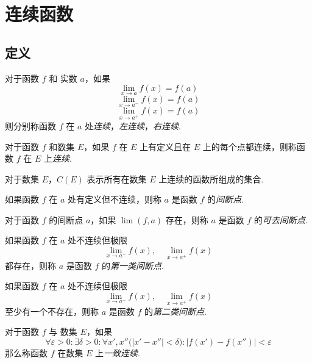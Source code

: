 \section{连续函数}
\subsection{定义}
\begin{definition}
    对于函数 $f$ 和 实数 $a$，如果
    \[\lim_{x \rightarrow a} f(x) = f(a)\]
    \[\lim_{x \rightarrow a^-} f(x) = f(a)\]
    \[\lim_{x \rightarrow a^+} f(x) = f(a)\]
    则分别称函数 $f$ 在 $a$ 处\emph{连续}，\emph{左连续}，\emph{右连续}.
\end{definition}\vspace{9pt}

\begin{definition}
    对于函数 $f$ 和数集 $E$，如果 $f$ 在 $E$ 上有定义且在 $E$ 上的每个点都连续，则称函数 $f$ 在 $E$ 上\emph{连续}.
\end{definition}\vspace{9pt}

\begin{definition}
    对于数集 $E$，$C(E)$ 表示所有在数集 $E$ 上连续的函数所组成的集合.
\end{definition}\vspace{9pt}

\begin{definition}
    如果函数 $f$ 在 $a$ 处有定义但不连续，则称 $a$ 是函数 $f$ 的\emph{间断点}.

    对于函数 $f$ 的间断点 $a$，如果 $\lim(f,a)$ 存在，则称 $a$ 是函数 $f$ 的\emph{可去间断点}.
\end{definition}\vspace{9pt}

\begin{subdefinition}
    如果函数 $f$ 在 $a$ 处不连续但极限
    \[\lim_{x \rightarrow a^-} f(x),\quad \lim_{x \rightarrow a^+}f(x)\]
    都存在，则称 $a$ 是函数 $f$ 的\emph{第一类间断点}.
\end{subdefinition}

\begin{subdefinition}
    如果函数 $f$ 在 $a$ 处不连续但极限
    \[\lim_{x \rightarrow a^-}f(x), \quad \lim_{x \rightarrow a^+}f(x)\]
    至少有一个不存在，则称 $a$ 是函数 $f$ 的\emph{第二类间断点}.
\end{subdefinition}\vspace{9pt}

\begin{definition}
    对于函数 $f$ 与 数集 $E$，如果
    \[\forall \varepsilon > 0: \exists \delta > 0: \forall x', x'' \bigl(\lvert x' - x''\rvert < \delta\bigr): \bigl| f(x') - f(x'')\bigr| < \varepsilon\]
    那么称函数 $f$ 在数集 $E$ 上\emph{一致连续}.
\end{definition}

